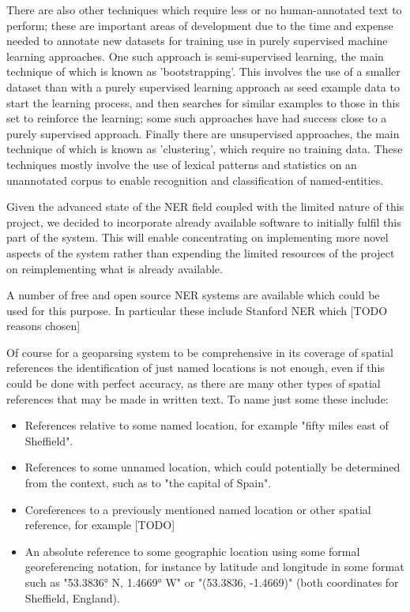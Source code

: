 \documentclass[12pt, a4paper]{report}
\begin{document}
There are also other techniques which require less or no human-annotated text to perform; these are important areas of development due to the time and expense needed to annotate new datasets for training use in purely supervised machine learning approaches. One such approach is semi-supervised learning, the main technique of which is known as 'bootstrapping'. This involves the use of a smaller dataset than with a purely supervised learning approach as seed example data to start the learning process, and then searches for similar examples to those in this set to reinforce the learning; some such approaches have had success close to a purely supervised approach. Finally there are unsupervised approaches, the main technique of which is known as 'clustering', which require no training data. These techniques mostly involve the use of lexical patterns and statistics on an unannotated corpus to enable recognition and classification of named-entities.

Given the advanced state of the NER field coupled with the limited nature of this project, we decided to incorporate already available software to initially fulfil this part of the system. This  will enable concentrating on implementing more novel aspects of the system rather than expending the limited resources of the project on reimplementing what is already available.

A number of free and open source NER systems are available which could be used for this purpose. In particular these include Stanford NER \citep{finkel2005} which [TODO reasons chosen]

Of course for a geoparsing system to be comprehensive in its coverage of spatial references the identification of just named locations is not enough, even if this could be done with perfect accuracy, as there are many other types of spatial references that may be made in written text. To name just some these include:

\begin{itemize}
	\item { References relative to some named location, for example "fifty miles east of Sheffield". }
	\item { References to some unnamed location, which could potentially be determined from the context, such as to "the capital of Spain".}
	\item { Coreferences to a previously mentioned named location or other spatial reference, for example [TODO]}
	\item { An absolute reference to some geographic location using some formal georeferencing notation, for instance by latitude and longitude in some format such as "53.3836° N, 1.4669° W" or "(53.3836, -1.4669)" (both coordinates for Sheffield, England). }
\end{itemize}
\end{document}
